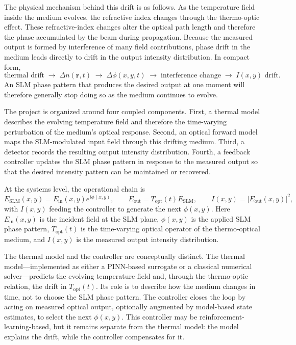 \documentclass[11pt,letterpaper]{article}
\begin{document}
The physical mechanism behind this drift is as follows. As the temperature field inside the medium
evolves, the refractive index changes through the thermo-optic effect. These refractive-index
changes alter the optical path length and therefore the phase accumulated by the beam during
propagation. Because the measured output is formed by interference of many field contributions,
phase drift in the medium leads directly to drift in the output intensity distribution. In compact
form,
\[
\text{thermal drift}
\;\longrightarrow\; \Delta n(\mathbf{r},t)
\;\longrightarrow\; \Delta \phi(x,y,t)
\;\longrightarrow\; \text{interference change}
\;\longrightarrow\; I(x,y)\text{ drift.}
\]
An SLM phase pattern that produces the desired output at one moment will therefore generally stop
doing so as the medium continues to evolve.

The project is organized around four coupled components. First, a thermal model describes the
evolving temperature field and therefore the time-varying perturbation of the medium’s optical
response. Second, an optical forward model maps the SLM-modulated input field through this drifting
medium. Third, a detector records the resulting output intensity distribution. Fourth, a feedback
controller updates the SLM phase pattern in response to the measured output so that the desired
intensity pattern can be maintained or recovered.

At the systems level, the operational chain is
\begin{equation}
E_{\mathrm{SLM}}(x,y)=E_{\mathrm{in}}(x,y)e^{i\phi(x,y)},
\qquad
E_{\mathrm{out}}=T_{\mathrm{opt}}(t)E_{\mathrm{SLM}},
\qquad
I(x,y)=\left|E_{\mathrm{out}}(x,y)\right|^2,
\end{equation}
with \(I(x,y)\) feeding the controller to generate the next \(\phi(x,y)\). Here
\(E_{\mathrm{in}}(x,y)\) is the incident field at the SLM plane, \(\phi(x,y)\) is the applied SLM
phase pattern, \(T_{\mathrm{opt}}(t)\) is the time-varying optical operator of the thermo-optical
medium, and \(I(x,y)\) is the measured output intensity distribution.

The thermal model and the controller are conceptually distinct. The thermal model---implemented as
either a PINN-based surrogate or a classical numerical solver---predicts the evolving temperature
field and, through the thermo-optic relation, the drift in \(T_{\mathrm{opt}}(t)\). Its role is to
describe how the medium changes in time, not to choose the SLM phase pattern. The controller closes
the loop by acting on measured optical output, optionally augmented by model-based state estimates,
to select the next \(\phi(x,y)\). This controller may be reinforcement-learning-based, but it
remains separate from the thermal model: the model explains the drift, while the controller
compensates for it.
\end{document}
